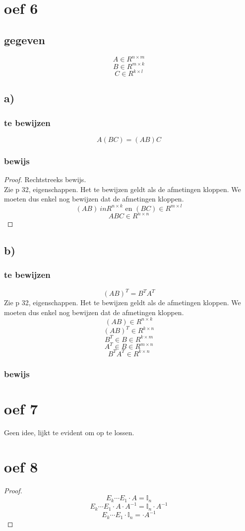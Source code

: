 \documentclass[lineaire_algebra_oplossingen.tex]{subfiles}
\begin{document}
\section{oef 6}
\subsection*{gegeven}
\[
A \in R^{n\times m}
\]
\[
B \in R^{m\times k}
\]
\[
C \in R^{k\times l}
\]
\subsection*{a)}
\subsubsection*{te bewijzen}
\[
A(BC) = (AB)C
\]
\subsubsection*{bewijs}
\begin{proof}
Rechtstreeks bewijs.\\
Zie p 32, eigenschappen. Het te bewijzen geldt als de afmetingen kloppen.
We moeten dus enkel nog bewijzen dat de afmetingen kloppen.
\[
(AB) \ in R^{n\times k} \text{ en } (BC) \in R^{m\times l}
\]
\[
ABC \in  R^{n\times n}
\]
\end{proof}

\subsection*{b)}
\subsubsection*{te bewijzen}
\[
(AB)^{T} = B^{T}A^{T}
\]
Zie p 32, eigenschappen. Het te bewijzen geldt als de afmetingen kloppen.
We moeten dus enkel nog bewijzen dat de afmetingen kloppen.
\[
(AB) \in R^{n\times k}
\]
\[
(AB)^T \in R^{k\times n}
\]
\[
B^{T} \in B \in R^{k\times m}
\]
\[
A^{T} \in B \in R^{m\times n}
\]
\[
 B^{T}A^{T} \in R^{k\times n}
\]
\subsubsection*{bewijs}
\section{oef 7}
Geen idee, lijkt te evident om op te lossen.
\section{oef 8}
\begin{proof}
\[
E_k\cdots E_1\cdot A = \mathbb{I}_n
\]
\[
E_k\cdots E_1\cdot A \cdot A^{-1} = \mathbb{I}_n \cdot A^{-1} 
\]
\[
E_k\cdots E_1\cdot \mathbb{I}_n =  \cdot A^{-1} 
\]
\end{proof}
\end{document}
